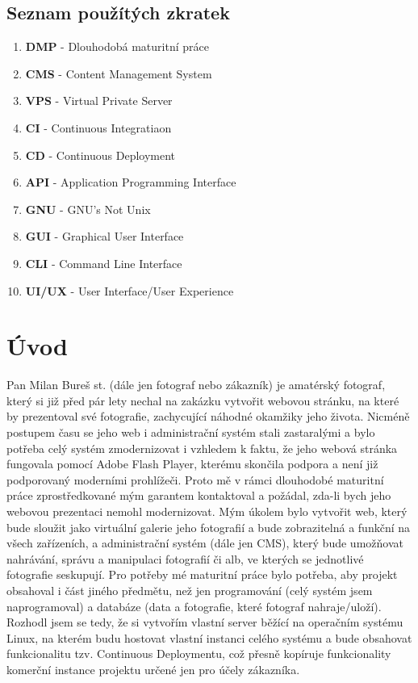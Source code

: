 \documentclass[12pt,a4paper]{report}
\begin{document}
  \section{Seznam použítých zkratek}
  \begin{enumerate}
    \item \textbf{DMP} - Dlouhodobá maturitní práce
    \item \textbf{CMS} - Content Management System
    \item \textbf{VPS} - Virtual Private Server
    \item \textbf{CI} - Continuous Integratiaon
    \item \textbf{CD} - Continuous Deployment
    \item \textbf{API} - Application Programming Interface
    \item \textbf{GNU} - GNU's Not Unix
    \item \textbf{GUI} - Graphical User Interface
    \item \textbf{CLI} - Command Line Interface
    \item \textbf{UI/UX} - User Interface/User Experience
  
  \end{enumerate} 
  
  \chapter{Úvod}
  Pan Milan Bureš st. (dále jen fotograf nebo zákazník) je amatérský fotograf, který si již před pár lety
  nechal na zakázku vytvořit webovou stránku, na které by prezentoval své fotografie, zachycující
  náhodné okamžiky jeho života. Nicméně postupem času se jeho web i administrační systém stali
  zastaralými a bylo potřeba celý systém zmodernizovat i vzhledem k faktu, že jeho webová stránka
  fungovala pomocí Adobe Flash Player, kterému skončila podpora a není již podporovaný
  moderními prohlížeči.
  Proto mě v rámci dlouhodobé maturitní práce zprostředkované mým garantem kontaktoval a
  požádal, zda-li bych jeho webovou prezentaci nemohl modernizovat. Mým úkolem bylo vytvořit
  web, který bude sloužit jako virtuální galerie jeho fotografií a bude zobrazitelná a funkční na všech
  zařízeních, a administrační systém (dále jen CMS), který bude umožňovat nahrávání, správu a
  manipulaci fotografií či alb, ve kterých se jednotlivé fotografie seskupují.
  Pro potřeby mé maturitní práce bylo potřeba, aby projekt obsahoval i část jiného předmětu, než
  jen programování (celý systém jsem naprogramoval) a databáze (data a fotografie, které fotograf
  nahraje/uloží). Rozhodl jsem se tedy, že si vytvořím vlastní server běžící na operačním systému
  Linux, na kterém budu hostovat vlastní instanci celého systému a bude obsahovat funkcionalitu
  tzv. Continuous Deploymentu, což přesně kopíruje funkcionality komerční instance projektu určené
  jen pro účely zákazníka.
\end{document}

